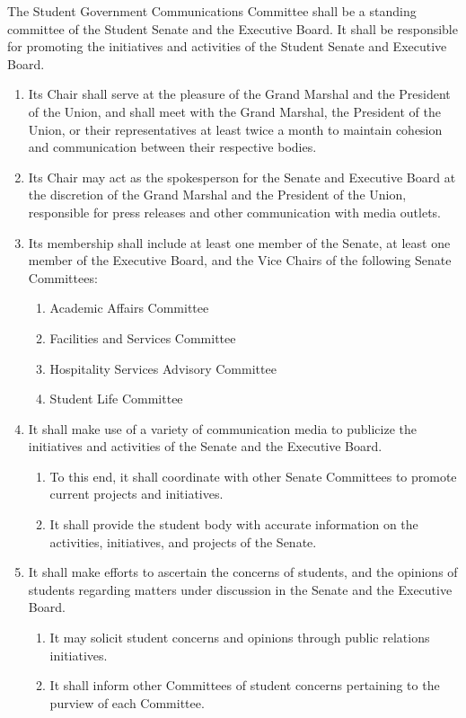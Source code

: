 \item The Student Government Communications Committee shall be a standing committee of the Student Senate and the Executive
Board. It shall be responsible for promoting the initiatives and activities of the Student Senate and Executive Board.
\begin{enumerate}
\item Its Chair shall serve at the pleasure of the Grand Marshal and the President of the Union, and shall meet with the Grand
Marshal, the President of the Union, or their representatives at least twice a month to maintain cohesion and
communication between their respective bodies.
\item Its Chair may act as the spokesperson for the Senate and Executive Board at the discretion of the Grand Marshal and the
President of the Union, responsible for press releases and other communication with media outlets.
\item Its membership shall include at least one member of the Senate, at least one member of the Executive Board, and the Vice
Chairs of the following Senate Committees:
\begin{enumerate}
\item Academic Affairs Committee
\item Facilities and Services Committee
\item Hospitality Services Advisory Committee
\item Student Life Committee
\end{enumerate}
\item It shall make use of a variety of communication media to publicize the initiatives and activities of the Senate and the
Executive Board.
\begin{enumerate}
\item To this end, it shall coordinate with other Senate Committees to promote current projects and initiatives.
\item It shall provide the student body with accurate information on the activities, initiatives, and projects of the Senate.
\end{enumerate}
\item It shall make efforts to ascertain the concerns of students, and the opinions of students regarding matters under discussion
in the Senate and the Executive Board.
\begin{enumerate}
\item It may solicit student concerns and opinions through public relations initiatives.
\item It shall inform other Committees of student concerns pertaining to the purview of each Committee.
\end{enumerate}


\end{enumerate}
